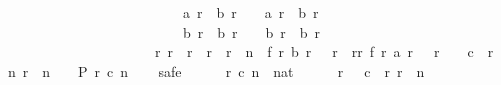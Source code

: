 \begin{isabellebody}
\ \ \ \ \ \ \ \ \ \ \ \ \ \ \ \ \ \ \ \ \ \ \ \ \ {\isacharparenleft}a\ r\ {\isacharequal}\ b\ {\isacharparenleft}r\ {\isacharminus}\ {}{\isacharparenright}\ {\isasymor}\ a\ r\ {\isacharequal}\ b\ {\isacharparenleft}r\ {\isacharminus}\ {}{\isacharparenright}\ {\isacharplus}\ {}{\isacharparenright}\ {\isasymand}\ \isanewline
\ \ \ \ \ \ \ \ \ \ \ \ \ \ \ \ \ \ \ \ \ \ \ \ \ {\isacharparenleft}b\ r\ {\isacharequal}\ b\ {\isacharparenleft}r\ {\isacharminus}\ {}{\isacharparenright}\ {\isasymor}\ b\ r\ {\isacharequal}\ b\ {\isacharparenleft}r\ {\isacharminus}\ {}{\isacharparenright}\ {\isacharplus}\ {}{\isacharparenright}{\isacharparenright}\ {\isasymand}\ \isanewline
\ \ \ \ \ \ \ \ \ \ \ \ \ \ \ \ \ \ \ \ {\isacharparenleft}{\isasymforall}\ r{\isachardot}\ r{}\ {\isasymle}\ r\ {\isasymand}\ r\ {\isacharless}\ r{}\ {\isacharplus}\ n\ {\isasymlongrightarrow}\ f\ r\ {\isacharparenleft}b\ r{\isacharparenright}\ {\isacharequal}\ {\isacharparenleft}{\isasymSum}\ r{\isacharprime}\ {\isasymleftarrow}\ {\isacharbrackleft}r{}{\isachardot}{\isachardot}{\isacharless}r{\isacharplus}{}{\isacharbrackright}{\isachardot}\ f\ r{\isacharprime}\ {\isacharparenleft}a\ r{\isacharprime}{\isacharparenright}{\isacharparenright}{\isacharparenright}{\isacharparenright}{\isachardoublequoteclose}\ {\isacharparenleft}\ {\isachardoublequoteopen}{\isasymforall}\ r{}\ {\isacharless}\ {}{}{}{}{\isachardot}\ {\isasymforall}\ c{}\ {\isasymle}\ r{}{\isachardot}\ {\isasymforall}\ n{\isachardot}\ r{}\ {\isacharplus}\ n\ {\isasymle}\ {}{}{}{}\ {\isasymlongrightarrow}\ {\isacharquery}P\ r{}\ c{}\ n{\isachardoublequoteclose}{\isacharparenright}\isanewline
\ \ \isamarkupfalse%
\ safe\isanewline
\ \ \ \ \isamarkupfalse%
\ r{}\ c{}\ n\ {\isacharcolon}{\isacharcolon}\ nat\isanewline
\ \ \ \ \isamarkupfalse%
\ {\isachardoublequoteopen}r{}\ {\isacharless}\ {}{}{}{}{\isachardoublequoteclose}\ {\isachardoublequoteopen}c{}\ {\isasymle}\ r{}{\isachardoublequoteclose}\ {\isachardoublequoteopen}r{}\ {\isacharplus}\ n\ {\isasymle}\ {}{}{}{}{\isachardoublequoteclose}\isanewline
\ \ \ \ \isamarkupfalse%

\end{isabellebody}
